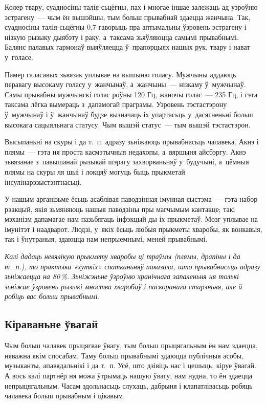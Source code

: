 Колер твару, суадносіны талія-сьцёгны, пах і многае іншае залежаць ад узроўню эстрагену~--- чым ён вышэйшы, тым больш прывабнай здаецца жанчына. Так, суадносіны талія-сьцёгны 0,7 гаворыць пра аптымальны ўзровень эстрагену і нізкую рызыку дыябэту і раку, а~таксама зьяўляюцца самымі прывабнымі. Балянс палавых гармонаў выяўляецца ў~прапорцыях нашых рук, твару і нават у~голасе.

Памер галасавых зьвязак уплывае на вышыню голасу. Мужчыны аддаюць перавагу высокаму голасу у~жанчынаў, а~жанчыны~--- нізкаму ў~мужчынаў. Самы прывабны мужчынскі голас роўны 120 Гц, жаночы голас~--- 235 Гц, і гэта таксама лёгка вымераць з~дапамогай праграмы. Узровень тэстастэрону ў~мужчынаў і ў~жанчынаў будзе вызначаць іх упартасьць у~дасягненьні больш высокага сацыяльнага статусу. Чым вышэй статус~--- тым вышэй тэстастэрон.

Высыпаньні на скуры і да т.~п. адразу зьніжаюць прывабнасьць чалавека. Акнэ і плямы~--- гэта ня проста касмэтычныя недахопы, а~вяршыня айсбэргу. Акнэ зьвязанае з~павышанай рызыкай шэрагу захворваньняў у~будучыні, а~цёмныя плямы на скуры ля шыі і локцяў могуць быць прыкметай інсулінарэзыстэнтнасьці.

У нашым арганізьме ёсьць асаблівая паводзінная імунная сыстэма~--- гэта набор рэакцый, якія зьмяняюць нашыя паводзіны пры магчымым кантакце; такі мэханізм дапамагае нам пазьбягаць інфэкцый ды іх прыкметаў. Мозг уплывае на імунітэт і наадварот. Людзі, у~якіх ёсьць любыя прыкметы хваробы, як вонкавыя, так і ўнутраныя, здаюцца нам непрыемнымі, меней прывабнымі.

\emph{Калі дадаць невялікую прыкмету хваробы ці траўмы (плямы, драпіны і да т.~п.), то практыка «хуткіх» спатканьняў паказала, што прывабнасьць адразу зьніжаецца на 80\,\%. Зьніжэньне ўзроўню хранічнага запаленьня ня толькі зьніжае ўзровень рызыкі мноства хваробаў і паскоранага старэньня, але й робіць вас больш прывабнымі.}

\subsection*{Кіраваньне ўвагай}

Чым больш чалавек прыцягвае ўвагу, тым больш прыцягальным ён нам здаецца, няважна якім спосабам. Таму больш прывабнымі здаюцца публічныя асобы, музыканты, апавядальнікі і да т.~п. Усё, што дзівіць нас і цешыць, кіруе ўвагай. А вось калі партнёр ня можа ўтрымаць нашую ўвагу, нам нудна, то ён здаецца непрыцягальным. Часам здольнасьць слухаць, дабрыня і клапатлівасьць робяць чалавека больш прывабным і цікавым.

